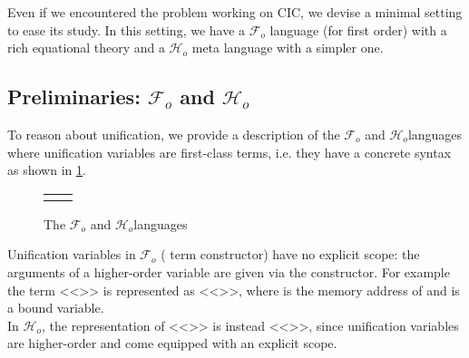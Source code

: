 \documentclass[sigconf,natbib=false,review]{acmart}
\newcommand{\Fo}{\texorpdfstring{\ensuremath{\mathcal{F}_{\!o}\xspace}}{Fo}} %
\newcommand{\Ho}{\texorpdfstring{\ensuremath{\mathcal{H}_o}\xspace}{Ho}}
\begin{document}
Even if we encountered the problem working on CIC, we devise
a minimal setting to ease its study. In this setting, we have
a \Fo{} language (for first order) with a rich equational
theory and a \Ho{} meta language with a simpler one.


\subsection{Preliminaries: \Fo{} and \Ho{}}

To reason about unification, we provide a description of the
\Fo{} and \Ho languages where unification variables
are first-class terms, i.e. they have a concrete syntax as
shown in \cref{code:common-terms}.
%
{
\setlength{\abovecaptionskip}{0pt}
\setlength{\belowcaptionskip}{-13pt}
\begin{figure}[b] %
  \begin{tabular}{ll}
  \begin{minipage}{0.21\textwidth}
   {code/fo_tm}
  \end{minipage}
  &
  \begin{minipage}{0.24\textwidth}
   {code/ho_tm}
  \end{minipage}
  \end{tabular}\vspace{4pt}
  \caption{The \Fo{} and \Ho languages}\vspace{0.3em}
  \label{code:common-terms}
\end{figure}
}
Unification variables
in \Fo{} ( term constructor) have no explicit scope:
the arguments of a higher-order variable are given via the 
constructor. For example the term <<>> is represented as
<<>>, where  is the memory address
of  and  is a bound variable.\\
In \Ho, the representation of <<>> is instead <<>>,
since unification variables are higher-order and come equipped with an
explicit scope.
%
\end{document}
